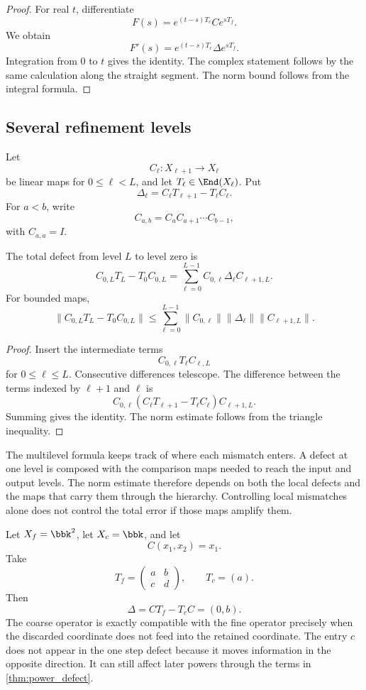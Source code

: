 \begin{proof}
For real $t$, differentiate
\[
F(s)=e^{(t-s)T_c}Ce^{sT_f}.
\]
We obtain
\[
F'(s)=e^{(t-s)T_c}\Delta e^{sT_f}.
\]
Integration from $0$ to $t$ gives the identity.  The complex statement follows by the same calculation along the straight segment.  The norm bound follows from the integral formula.
\end{proof}

\subsection{Several refinement levels}

Let
\[
C_\ell:X_{\ell+1}\longrightarrow X_\ell
\]
be linear maps for $0\leq\ell<L$, and let $T_\ell\in\End(X_\ell)$.  Put
\[
\Delta_\ell=C_\ell T_{\ell+1}-T_\ell C_\ell.
\]
For $a<b$, write
\[
C_{a,b}=C_aC_{a+1}\cdots C_{b-1},
\]
with $C_{a,a}=I$.

\begin{theorem}\label{thm:multilevel_defect}
The total defect from level $L$ to level zero is
\[
C_{0,L}T_L-T_0C_{0,L}
=
\sum_{\ell=0}^{L-1}
C_{0,\ell}\Delta_\ell C_{\ell+1,L}.
\]
For bounded maps,
\[
\|C_{0,L}T_L-T_0C_{0,L}\|
\leq
\sum_{\ell=0}^{L-1}
\|C_{0,\ell}\|
\|\Delta_\ell\|
\|C_{\ell+1,L}\|.
\]
\end{theorem}

\begin{proof}
Insert the intermediate terms
\[
C_{0,\ell}T_\ell C_{\ell,L}
\]
for $0\leq\ell\leq L$.  Consecutive differences telescope.  The difference between the terms indexed by $\ell+1$ and $\ell$ is
\[
C_{0,\ell}(C_\ell T_{\ell+1}-T_\ell C_\ell)C_{\ell+1,L}.
\]
Summing gives the identity.  The norm estimate follows from the triangle inequality.
\end{proof}

\begin{interpretation}
The multilevel formula keeps track of where each mismatch enters. A defect at one level is composed with the comparison maps needed to reach the input and output levels. The norm estimate therefore depends on both the local defects and the maps that carry them through the hierarchy. Controlling local mismatches alone does not control the total error if those maps amplify them.
\end{interpretation}

\begin{example}\label{ex:defect_example}
Let $X_f=\bbk^2$, let $X_c=\bbk$, and let
\[
C(x_1,x_2)=x_1.
\]
Take
\[
T_f=
\begin{pmatrix}
a&b\\
c&d
\end{pmatrix},
\qquad
T_c=(a).
\]
Then
\[
\Delta=CT_f-T_cC=(0,b).
\]
The coarse operator is exactly compatible with the fine operator precisely when the discarded coordinate does not feed into the retained coordinate.  The entry $c$ does not appear in the one step defect because it moves information in the opposite direction.  It can still affect later powers through the terms in \cref{thm:power_defect}.
\end{example}

